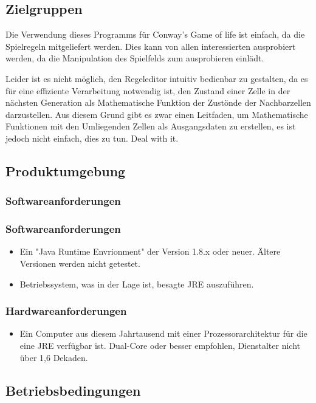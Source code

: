 \documentclass[11pt]{article}
\begin{document}
\subsection{Zielgruppen}
Die Verwendung dieses Programms für Conway's Game of life ist einfach, da die Spielregeln mitgeliefert werden. Dies kann von allen interessierten ausprobiert werden, da die Manipulation des Spielfelds zum ausprobieren einlädt.

Leider ist es nicht möglich, den Regeleditor intuitiv bedienbar zu gestalten, da es für eine effiziente Verarbeitung notwendig ist, den Zustand einer Zelle in der nächsten Generation als Mathematische Funktion der Zustönde der Nachbarzellen darzustellen. Aus diesem Grund gibt es zwar einen Leitfaden, um Mathematische Funktionen mit den Umliegenden Zellen als Ausgangsdaten zu erstellen, es ist jedoch nicht einfach, dies zu tun. Deal with it.
\subsection{Produktumgebung}
\subsubsection{Softwareanforderungen}

\subsubsection{Softwareanforderungen}
\begin{itemize}
    \item Ein "Java Runtime Envrionment" der Version 1.8.x oder neuer. Ältere Versionen werden nicht getestet.
    \item Betriebssystem, was in der Lage ist, besagte JRE auszuführen. 
\end{itemize}

\subsubsection{Hardwareanforderungen}


\begin{itemize}
    \item Ein Computer aus diesem Jahrtausend mit einer Prozessorarchitektur für die eine JRE verfügbar ist. Dual-Core oder besser empfohlen, Dienstalter nicht über 1,6 Dekaden.
\end{itemize}


\subsection{Betriebsbedingungen}
\end{document}
